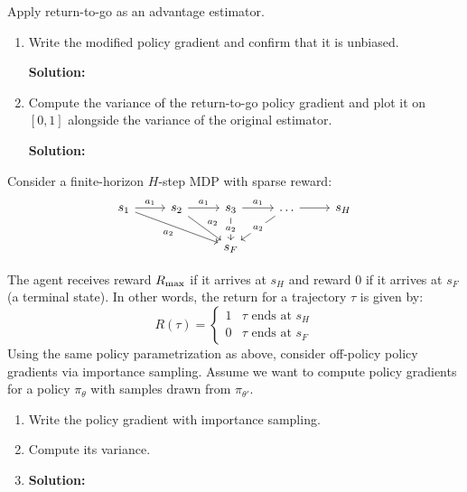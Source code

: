 \documentclass{article}
\begin{document}
\begin{enumerate}
\newpage
{} Apply return-to-go as an advantage estimator.
\begin{enumerate}
    \item Write the modified policy gradient and confirm that it is unbiased.

\textbf{Solution:}

    \item Compute the variance of the return-to-go policy gradient and plot it on $[0, 1]$ alongside the variance of the original estimator.

\textbf{Solution:}

\end{enumerate}
\newpage
{} Consider a finite-horizon $H$-step MDP with sparse reward:
\[\begin{tikzcd}
	{s_1} & {s_2} & {s_3} & \dots & {s_H} \\
	&& {s_F}
	\arrow["{a_1}", from=1-1, to=1-2]
	\arrow["{a_1}", from=1-2, to=1-3]
	\arrow["{a_2}"', from=1-1, to=2-3]
	\arrow["{a_1}", from=1-3, to=1-4]
	\arrow[from=1-4, to=1-5]
	\arrow["{a_2}", from=1-2, to=2-3]
	\arrow["{a_2}"{description}, from=1-3, to=2-3]
	\arrow["{a_2}"{description}, from=1-4, to=2-3]
\end{tikzcd}\]

The agent receives reward $R_{\textrm{max}}$ if it arrives at $s_H$ and reward $0$ if it arrives at $s_F$ (a terminal state). In other words, the return for a trajectory $\tau$ is given by:
\[R(\tau) = \begin{cases}1 & \tau \textrm{ ends at } s_H \\ 0 & \tau \textrm{ ends at } s_F \end{cases}\]
Using the same policy parametrization as above, consider off-policy policy gradients via importance sampling. Assume we want to compute policy gradients for a policy $\pi_\theta$ with samples drawn from $\pi_{\theta'}$.
\begin{enumerate}
    \item Write the policy gradient with importance sampling.

    \item Compute its variance.
    
    \item \textbf{Solution:}
    

\end{enumerate}
\end{enumerate}
\end{document}
